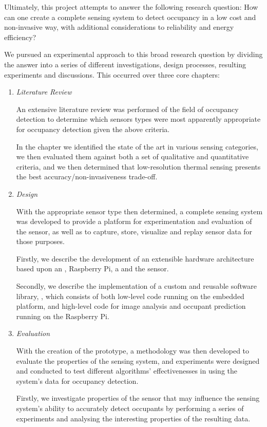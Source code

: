\documentclass[../thesis/thesis.tex]{subfiles}
\begin{document}
Ultimately, this project attempts to answer the following research question: How can one create a complete sensing system to detect occupancy in a low cost and non-invasive way, with additional considerations to reliability and energy efficiency?

We pursued an experimental approach to this broad research question by dividing the answer into a series of different investigations, design processes, resulting experiments and discussions. This occurred over three core chapters:

\begin{enumerate}
\item \emph{Literature Review}

An extensive literature review was performed of the field of occupancy detection to determine which sensors types were most apparently appropriate for occupancy detection given the above criteria. 

In the chapter we identified the state of the art in various sensing categories, we then evaluated them against both a set of qualitative and quantitative criteria, and we then determined that low-resolution thermal sensing presents the best accuracy/non-invasiveness trade-off.

\item \emph{Design}

With the appropriate sensor type then determined, a complete sensing system was developed to provide a platform for experimentation and evaluation of the sensor, as well as to capture, store, visualize and replay sensor data for those purposes.

Firstly, we describe the development of an extensible hardware architecture based upon an \ard, Raspberry Pi, a \pir and the \mlx sensor.

Secondly, we describe the implementation of a custom and reusable software library, \tarl, which consists of both low-level code running on the \ard embedded platform, and high-level code for image analysis and occupant prediction running on the Raspberry Pi.

\item \emph{Evaluation}

With the creation of the prototype, a methodology was then developed to evaluate the properties of the sensing system, and experiments were designed and conducted to test different algorithms' effectivenesses in using the system's data for occupancy detection.

Firstly, we investigate properties of the sensor that may influence the sensing system's ability to accurately detect occupants by performing a series of experiments and analysing the interesting properties of the resulting data.


\end{enumerate}
\end{document}
